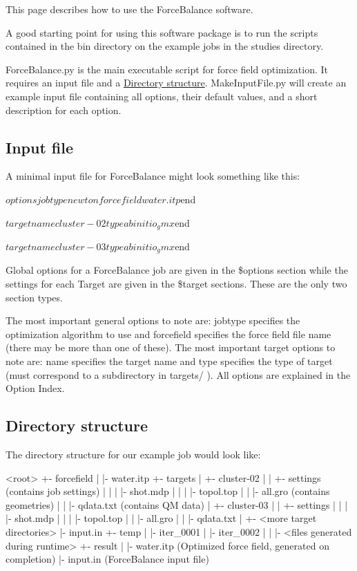 This page describes how to use the Force\+Balance software.

A good starting point for using this software package is to run the scripts contained in the {\ttfamily bin} directory on the example jobs in the {\ttfamily studies} directory.

{\ttfamily Force\+Balance.\+py} is the main executable script for force field optimization. It requires an input file and a \hyperlink{usage_directory_structure}{Directory structure}. {\ttfamily Make\+Input\+File.\+py} will create an example input file containing all options, their default values, and a short description for each option.\hypertarget{usage_input_file}{}\subsection{Input file}\label{usage_input_file}
A minimal input file for Force\+Balance might look something like this\+:

\begin{DoxyVerb} $options
 jobtype newton
 forcefield water.itp
 $end
 
 $target
 name cluster-02
 type abinitio_gmx
 $end
 
 $target
 name cluster-03
 type abinitio_gmx
 $end\end{DoxyVerb}


Global options for a Force\+Balance job are given in the {\ttfamily \$options} section while the settings for each Target are given in the {\ttfamily \$target} sections. These are the only two section types.

The most important general options to note are\+: {\ttfamily jobtype} specifies the optimization algorithm to use and {\ttfamily forcefield} specifies the force field file name (there may be more than one of these). The most important target options to note are\+: {\ttfamily name} specifies the target name and {\ttfamily type} specifies the type of target (must correspond to a subdirectory in {\ttfamily targets/} ). All options are explained in the Option Index.\hypertarget{usage_directory_structure}{}\subsection{Directory structure}\label{usage_directory_structure}
The directory structure for our example job would look like\+:

\begin{DoxyVerb} <root>
   +- forcefield
   |   |- water.itp
   +- targets
   |   +- cluster-02
   |   |   +- settings (contains job settings)
   |   |   |   |- shot.mdp
   |   |   |   |- topol.top
   |   |   |- all.gro (contains geometries)
   |   |   |- qdata.txt (contains QM data)
   |   +- cluster-03
   |   |   +- settings
   |   |   |   |- shot.mdp
   |   |   |   |- topol.top
   |   |   |- all.gro
   |   |   |- qdata.txt
   |   +- <more target directories>
   |- input.in
   +- temp
   |   |- iter_0001
   |   |- iter_0002
   |   |   |- <files generated during runtime>
   +- result
   |   |- water.itp (Optimized force field, generated on completion)
   |- input.in (ForceBalance input file)\end{DoxyVerb}


